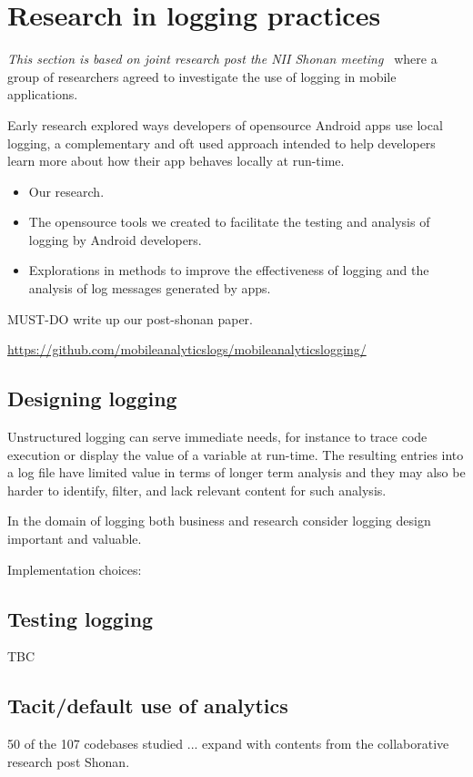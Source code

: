 \section{Research in logging practices}
\textit{This section is based on joint research post the NII Shonan meeting~\citep{nii_shonan_workshop_152}} where a group of researchers agreed to investigate the use of logging in mobile applications.

Early research explored ways developers of opensource Android apps use local logging, a complementary and oft used approach intended to help developers learn more about how their app behaves locally at run-time. 

\begin{itemize}
    \item Our research.
    \item The opensource tools we created to facilitate the testing and analysis of logging by Android developers.
    \item Explorations in methods to improve the effectiveness of logging and the analysis of log messages generated by apps.
\end{itemize}

MUST-DO write up our post-shonan paper.

\url{https://github.com/mobileanalyticslogs/mobileanalyticslogging/}


\subsection{Designing logging}
Unstructured logging can serve immediate needs, for instance to trace code execution or display the value of a variable at run-time. The resulting entries into a log file have limited value in terms of longer term analysis and they may also be harder to identify, filter, and lack relevant content for such analysis.

In the domain of logging both business and research consider logging design important and valuable. 

Implementation choices: 

\subsection{Testing logging}
TBC

\subsection{Tacit/default use of analytics}
50 of the 107 codebases studied ... expand with contents from the collaborative research post Shonan.

